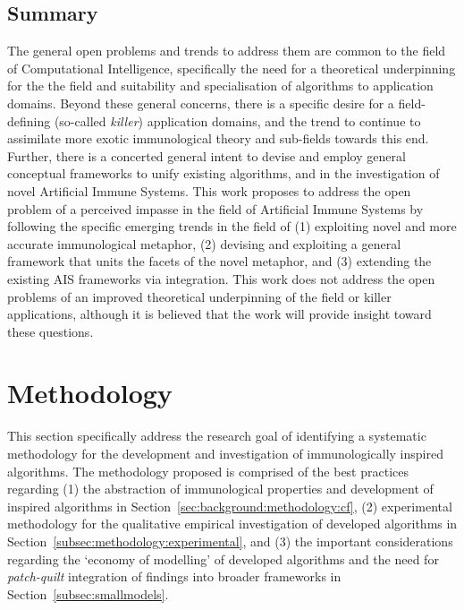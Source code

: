 %
%
\subsection{Summary}
The general open problems and trends to address them are common to the field of Computational Intelligence, specifically the need for a theoretical underpinning for the the field and suitability and specialisation of algorithms to application domains. Beyond these general concerns, there is a specific desire for a field-defining (so-called \emph{killer}) application domains, and the trend to continue to assimilate more exotic immunological theory and sub-fields towards this end. Further, there is a concerted general intent to devise and employ general conceptual frameworks to unify existing algorithms, and in the investigation of novel Artificial Immune Systems. This work proposes to address the open problem of a perceived impasse in the field of Artificial Immune Systems by following the specific emerging trends in the field of (1) exploiting novel and more accurate immunological metaphor, (2) devising and exploiting a general framework that units the facets of the novel metaphor, and (3) extending the existing AIS frameworks via integration. This work does not address the open problems of an improved theoretical underpinning of the field or killer applications, although it is believed that the work will provide insight toward these questions.


%
%
\section{Methodology}
\label{sec:background:methodology}
This section specifically address the research goal of identifying a systematic methodology for the development and investigation of immunologically inspired algorithms. 
The methodology proposed is comprised of the best practices regarding (1) the abstraction of immunological properties and development of inspired algorithms in Section~\ref{sec:background:methodology:cf}, (2) experimental methodology for the qualitative empirical investigation of developed algorithms in Section~\ref{subsec:methodology:experimental}, and (3) the important considerations regarding the `economy of modelling' of developed algorithms and the need for \emph{patch-quilt} integration of findings into broader frameworks in Section~\ref{subsec:smallmodels}.


% 
%
